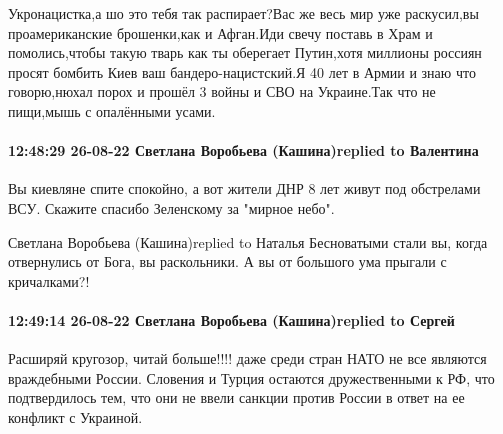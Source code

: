 Укронацистка,а шо это тебя так распирает?Вас же весь мир уже раскусил,вы
проамериканские брошенки,как и Афган.Иди свечу поставь в Храм и помолись,чтобы
такую тварь как ты оберегает Путин,хотя миллионы россиян просят бомбить Киев
ваш бандеро-нацистский.Я 40 лет в Армии и знаю что говорю,нюхал порох и прошёл
3 войны и СВО на Украине.Так что не пищи,мышь с опалёнными усами.


\paragraph{12:48:29 26-08-22 Светлана Воробьева (Кашина)replied to Валентина}

Вы киевляне спите спокойно, а вот жители ДНР 8 лет живут под обстрелами ВСУ.
Скажите спасибо Зеленскому за "мирное небо".

Светлана Воробьева (Кашина)replied to Наталья
Бесноватыми стали вы, когда отвернулись от Бога, вы раскольники. А вы от большого ума прыгали с кричалками?!

\paragraph{12:49:14 26-08-22 Светлана Воробьева (Кашина)replied to Сергей}

Расширяй кругозор, читай больше!!!! даже среди стран НАТО не все являются
враждебными России. Словения и Турция остаются дружественными к РФ, что
подтвердилось тем, что они не ввели санкции против России в ответ на ее
конфликт с Украиной.

